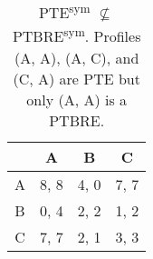 \begin{table}
	\caption{
		PTE\textsuperscript{sym} $\not\subseteq$ PTBRE\textsuperscript{sym}.
		Profiles (A, A), (A, C), and (C, A) are PTE but only (A, A) is a PTBRE.
	}
	\label{tab:ties-pte-not-sub-ptbre}
	\centering
	\begin{tabular}{|c|c|c|c|}
		\hline
			& A		& B	   & C	  \\
		\hline
		A 		&\cellcolor{gray!00} 8, 8 &\cellcolor{gray!70} 4, 0 &\cellcolor{gray!00} 7, 7 \\
		\hline
		B		&\cellcolor{gray!70} 0, 4 &\cellcolor{gray!70} 2, 2 &\cellcolor{gray!70} 1, 2 \\
		\hline
		C		&\cellcolor{gray!00} 7, 7 &\cellcolor{gray!70} 2, 1 &\cellcolor{gray!70} 3, 3 \\
		\hline
	\end{tabular}
\end{table}
